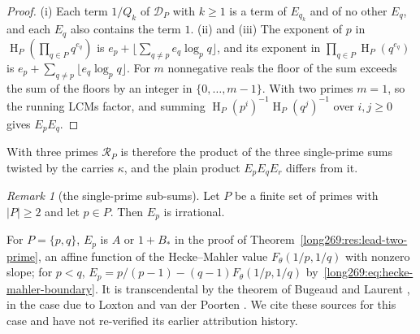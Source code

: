 \documentclass[11pt]{article}
\theoremstyle{remark}
\newtheorem{recordremark}[theorem]{Remark}
\renewenvironment{remark}[1][]{\begin{recordremark}[#1]}{\end{recordremark}}
\theoremstyle{plain}
\newcommand{\hgt}{\operatorname{H}}
\begin{document}
\begin{proof}
(i) Each term $1/Q_k$ of $\mathcal D_P$ with $k\ge1$ is a term of $E_{q_k}$
and of no other $E_q$, and each $E_q$ also contains the term $1$.
(ii) and (iii) The exponent of $p$ in $\hgt_P(\prod_{q\in P}q^{e_q})$ is
$e_p+\lfloor\sum_{q\ne p}e_q\log_pq\rfloor$, and its exponent in
$\prod_{q\in P}\hgt_P(q^{e_q})$ is $e_p+\sum_{q\ne p}\lfloor e_q\log_pq\rfloor$.
For $m$ nonnegative reals the floor of the sum exceeds the sum of the floors
by an integer in $\{0,\ldots,m-1\}$.  With two primes $m=1$, so the running LCMs
factor, and summing $\hgt_P(p^i)^{-1}\hgt_P(q^j)^{-1}$ over $i,j\ge0$ gives
$E_pE_q$.
\end{proof}

With three primes $\mathcal R_P$ is therefore the product of the three
single-prime sums twisted by the carries $\kappa$, and the plain product
$E_pE_qE_r$ differs from it.

\begin{remark}[the single-prime sub-sums]\label{long269:res:single-prime-subsums}
Let $P$ be a finite set of primes with $|P|\ge2$ and let $p\in P$.  Then
$E_p$ is irrational.
\end{remark}


For $P=\{p,q\}$, $E_p$ is $A$ or $1+B_\ast$ in the proof of
Theorem~\ref{long269:res:lead-two-prime}, an affine function of the
Hecke--Mahler value $F_\theta(1/p,1/q)$ with nonzero slope; for $p<q$,
$E_p=p/(p-1)-(q-1)F_\theta(1/p,1/q)$ by~\eqref{long269:eq:hecke-mahler-boundary}.
It is transcendental by the theorem of Bugeaud and Laurent
\cite[Theorem~1.1]{bugeaudlaurent2023}, in the case due to Loxton and van der
Poorten \cite[Theorem~8, p.~40]{loxtonvdp1977}.  We cite these sources for
this case and have not re-verified its earlier attribution history.
\end{document}

